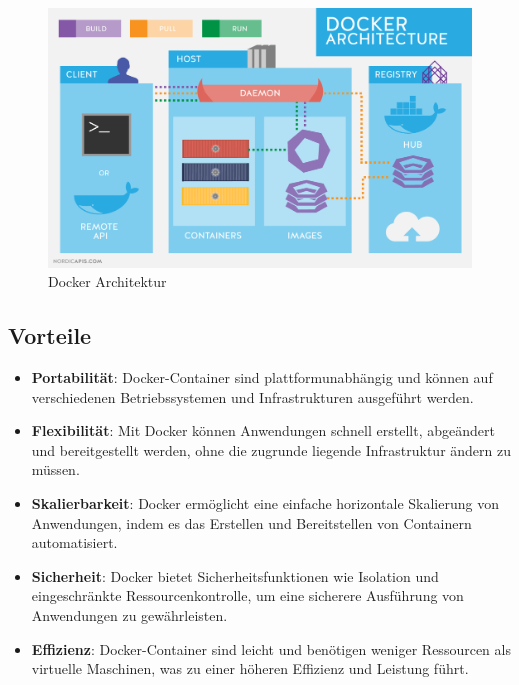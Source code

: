     \begin{figure}[H]
        \centering
        \includegraphics[scale=0.3]{pics/Docker_Architecture.png}
        \caption{Docker Architektur}
    \end{figure}

\subsection{Vorteile}
\begin{itemize}
    \item \textbf{Portabilität}: Docker-Container sind plattformunabhängig und können auf verschiedenen Betriebssystemen und Infrastrukturen ausgeführt werden.
    
    \item \textbf{Flexibilität}: Mit Docker können Anwendungen schnell erstellt, abgeändert und bereitgestellt werden, ohne die zugrunde liegende Infrastruktur ändern zu müssen.
    
    \item \textbf{Skalierbarkeit}: Docker ermöglicht eine einfache horizontale Skalierung von Anwendungen, indem es das Erstellen und Bereitstellen von Containern automatisiert.
    
    \item \textbf{Sicherheit}: Docker bietet Sicherheitsfunktionen wie Isolation und eingeschränkte Ressourcenkontrolle, um eine sicherere Ausführung von Anwendungen zu gewährleisten.
    
    \item \textbf{Effizienz}: Docker-Container sind leicht und benötigen weniger Ressourcen als virtuelle Maschinen, was zu einer höheren Effizienz und Leistung führt.
    \end{itemize}

